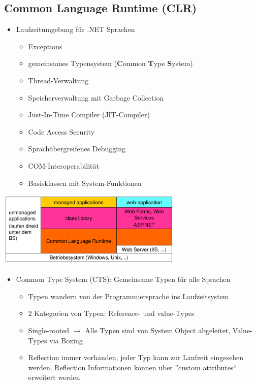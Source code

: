 \subsection{Common Language Runtime (CLR)}
\begin{multicols}{2}

	\begin{itemize}
		\item Laufzeitumgebung für .NET Sprachen
			\begin{itemize}
				\item Exceptions
				\item gemeinsames Typensystem (\textbf{C}ommon \textbf{T}ype \textbf{S}ystem)
				\item Thread-Verwaltung
				\item Speicherverwaltung mit Garbage Collection
				\item Just-In-Time Compiler (JIT-Compiler)
				\item Code Access Security
				\item Sprachübergreifenes Debugging
				\item COM-Interoperabilität
				\item Basisklassen mit System-Funktionen
			\end{itemize}
	\end{itemize}
	
	\columnbreak
	
	\includegraphics[width=9cm]{images/CSharp/aufbau_dotNet}
	
\end{multicols}
\begin{itemize}
	\item Common Type System (CTS): Gemeinsame Typen für alle Sprachen
		\label{csharpCTS}
		\begin{itemize}
			\item Typen wandern von der Programmiersprache ins Laufzeitsystem
			\item 2 Kategorien von Typen: Reference- und value-Types
			\item Single-rooted $\rightarrow$ Alle Typen sind von System.Object abgeleitet, Value-Types via Boxing
			\item Reflection immer vorhanden, jeder Typ kann zur Laufzeit eingesehen werden.
				Reflection Informationen können über ''custom attributes`` erweitert werden
		\end{itemize}
\end{itemize}


